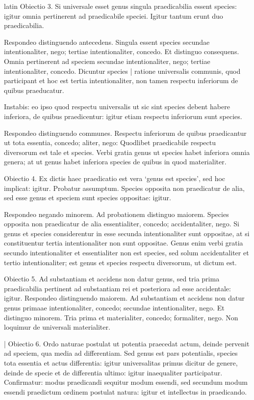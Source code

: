 \begin{otherlanguage*}{latin}
\pstart
  Obiectio 3. Si universale esset genus singula praedicabilia essent species: igitur omnia pertinerent ad praedicabile speciei. Igitur tantum erunt duo praedicabilia. 
\pend

\pstart
  Respondeo distinguendo antecedens. Singula essent species secundae intentionaliter, nego; tertiae intentionaliter, concedo. Et distinguo consequens. Omnia pertinerent ad speciem secundae intentionaliter, nego; tertiae intentionaliter, concedo. Dicuntur species \textnormal{|} ratione universalis communis, quod participant et hoc est tertia intentionaliter, non tamen respectu inferiorum de quibus praeducatur. 
\pend

\pstart
  Instabis: eo ipso quod respectu universalis ut sic sint species debent habere inferiora, de quibus praedicentur: igitur etiam respectu inferiorum sunt species. 
\pend

\pstart
  Respondeo distinguendo communes. Respectu inferiorum de quibus praedicantur ut tota essentia, concedo; aliter, nego: Quodlibet praedicabile respectu diversorum est tale et species. Verbi gratia genus ut species habet inferiora omnia genera; at ut genus habet inferiora species de quibus in quod materialiter. 
\pend

\pstart
  Obiectio 4. Ex dictis haec praedicatio est vera `genus est species', sed hoc implicat: igitur. Probatur assumptum. Species opposita non praedicatur de alia, sed esse genus et speciem sunt species oppositae: igitur. 
\pend

\pstart
  Respondeo negando minorem. Ad probationem distinguo maiorem. Species opposita non praedicatur de alia essentialiter, concedo; accidentaliter, nego. Si genus et species considerentur in esse secunda intentionaliter sunt oppositae, at si constituentur tertia intentionaliter non sunt oppositae. Genus enim verbi gratia secundo intentionaliter et essentialiter non est species, sed solum accidentaliter et tertio intentionaliter; est genus et species respectu diversorum, ut dictum est. 
\pend

\pstart
  Obiectio 5. Ad substantiam et accidens non datur genus, sed tria prima praedicabilia pertinent ad substantiam rei et posteriora ad esse accidentale: igitur. Respondeo distinguendo maiorem. Ad substantiam et accidens non datur genus primaae intentionaliter, concedo; secundae intentionaliter, nego. Et distinguo minorem. Tria prima et materialiter, concedo; formaliter, nego. Non loquimur de universali materialiter. 
\pend

\pstart
  \textnormal{|}   Obiectio 6. Ordo naturae postulat ut potentia praecedat actum, deinde pervenit ad speciem, qua media ad differentiam. Sed genus est pars potentialis, species tota essentia et actus differentia: igitur universalitas primus dicitur de genere, deinde de specie et de differentia ultimo: igitur inaequaliter participatur. Confirmatur: modus praedicandi sequitur modum essendi, sed secundum modum essendi praedictum ordinem postulat natura: igitur et intellectus in praedicando. 
\pend


\end{otherlanguage*}
